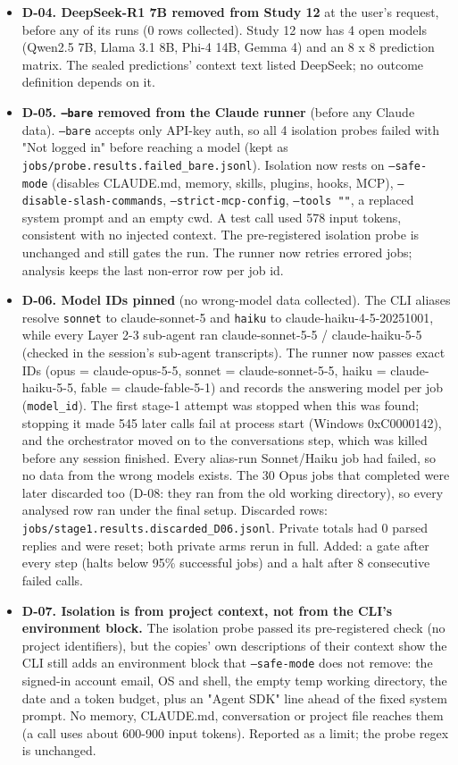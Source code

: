 \begin{itemize}
\item \textbf{D-04. DeepSeek-R1 7B removed from Study 12} at the user's request, before any of its runs (0 rows collected). Study 12 now has 4 open models (Qwen2.5 7B, Llama 3.1 8B, Phi-4 14B, Gemma 4) and an 8 x 8 prediction matrix. The sealed predictions' context text listed DeepSeek; no outcome definition depends on it.
\item \textbf{D-05. \texttt{--bare} removed from the Claude runner} (before any Claude data). \texttt{--bare} accepts only API-key auth, so all 4 isolation probes failed with "Not logged in" before reaching a model (kept as \texttt{jobs/probe.results.failed\_bare.jsonl}). Isolation now rests on \texttt{--safe-mode} (disables CLAUDE.md, memory, skills, plugins, hooks, MCP), \texttt{--disable-slash-commands}, \texttt{--strict-mcp-config}, \texttt{--tools ""}, a replaced system prompt and an empty cwd. A test call used 578 input tokens, consistent with no injected context. The pre-registered isolation probe is unchanged and still gates the run. The runner now retries errored jobs; analysis keeps the last non-error row per job id.
\item \textbf{D-06. Model IDs pinned} (no wrong-model data collected). The CLI aliases resolve \texttt{sonnet} to claude-sonnet-5 and \texttt{haiku} to claude-haiku-4-5-20251001, while every Layer 2-3 sub-agent ran claude-sonnet-5-5 / claude-haiku-5-5 (checked in the session's sub-agent transcripts). The runner now passes exact IDs (opus = claude-opus-5-5, sonnet = claude-sonnet-5-5, haiku = claude-haiku-5-5, fable = claude-fable-5-1) and records the answering model per job (\texttt{model\_id}). The first stage-1 attempt was stopped when this was found; stopping it made 545 later calls fail at process start (Windows 0xC0000142), and the orchestrator moved on to the conversations step, which was killed before any session finished. Every alias-run Sonnet/Haiku job had failed, so no data from the wrong models exists. The 30 Opus jobs that completed were later discarded too (D-08: they ran from the old working directory), so every analysed row ran under the final setup. Discarded rows: \texttt{jobs/stage1.results.discarded\_D06.jsonl}. Private totals had 0 parsed replies and were reset; both private arms rerun in full. Added: a gate after every step (halts below 95\% successful jobs) and a halt after 8 consecutive failed calls.
\item \textbf{D-07. Isolation is from project context, not from the CLI's environment block.} The isolation probe passed its pre-registered check (no project identifiers), but the copies' own descriptions of their context show the CLI still adds an environment block that \texttt{--safe-mode} does not remove: the signed-in account email, OS and shell, the empty temp working directory, the date and a token budget, plus an "Agent SDK" line ahead of the fixed system prompt. No memory, CLAUDE.md, conversation or project file reaches them (a call uses about 600-900 input tokens). Reported as a limit; the probe regex is unchanged.

\end{itemize}
